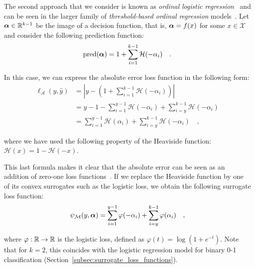 The second approach that we consider is known as \emph{ordinal logistic regression}~\citep{Rennie} and can be seen in the larger family of \emph{threshold-based ordinal regression} models~\citep{McCullagh1980,Rennie,Keerthi2003,lin2006large}. 
Let $\boldsymbol \alpha \in {\mathbb R}^{k-1}$ be the image of a decision function, that is, $\boldsymbol \alpha = f(x)$ for some $x \in \mathcal{X}$ and consider the following prediction function:
\begin{equation}\label{eq:prediction_threshold}
\text{pred}(\balpha) = 1 + \sum_{i=1}^{k-1} \mathcal{H}(-\alpha_i) \quad .
\end{equation}

In this case, we can express the absolute error loss function in the following form:
$$
\begin{aligned}
\ell_{\mathcal{A}}(y, \hat{y}) &= |y - \left(1 + \sum_{i=1}^{k-1} \mathcal{H}(-\alpha_i)\right)| \\
&= y - 1 - \sum_{i=1}^{y-1} \mathcal{H}(-\alpha_i) + \sum_{i=y}^{k-1} \mathcal{H}(-\alpha_i)\\
&= \sum_{i=1}^{y-1} \mathcal{H}(\alpha_i) + \sum_{i=y}^{k-1} \mathcal{H}(-\alpha_i) \quad,
\end{aligned}
$$

where we have used the following property of the Heaviside function: $\mathcal{H}(x) = 1 - \mathcal{H}(-x)$.



This last formula makes it clear that the absolute error can be seen as an addition of zero-one loss functions~. If we replace the Heaviside function by one of its convex surrogates such as the logistic loss, we obtain the following surrogate loss function:
\begin{equation} \label{eq:absolute_error_surrogate}
\psi_{\mathcal{M}}(y, \balpha) = \sum_{i=1}^{y-1} \varphi(-\alpha_i) + \sum_{i=y}^{k-1} \varphi(\alpha_i) \quad,
\end{equation}

where $\varphi: {\mathbb R} \to {\mathbb R}$ is the logistic loss, defined as $\varphi(t) = \log(1 + e^{-t})$. Note that for $k=2$, this coincides with the logistic regression model for binary 0-1 classification (Section~\ref{subsec:surrogate_loss_functions}).


